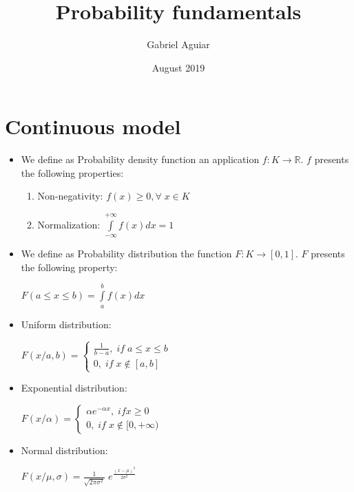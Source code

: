 \documentclass{article}
\title{Probability fundamentals}
\author{Gabriel Aguiar}
\date{August 2019}
\begin{document}
\maketitle

\section{Continuous model}

\begin{itemize}

\item We define as Probability density function an application $f: K \rightarrow \mathbb{R}$. $f$ presents the following properties:

\begin{enumerate}

\item Non-negativity: $f(x) \geq 0, \forall \; x \in K$

\item Normalization: $\int\limits_{-\infty}^{+\infty} f(x) dx = 1$

\end{enumerate}

\item We define as Probability distribution the function $F: K \rightarrow [0,1]$. $F$ presents the following property:

$F(a \leq x \leq b) = \int\limits_{a}^{b} f(x) dx$

\item Uniform distribution:

$F(x/a,b) = \begin{cases} \frac{1}{b - a}, \; if \; a \leq x \leq b \\ 0, \; if \; x \notin [a,b] \end{cases}$

\item Exponential distribution:

$F(x/\alpha) = \begin{cases} \alpha e^{-\alpha x}, \; if x \geq 0 \\ 0, \; if \; x \notin [0,+\infty) \end{cases}$

\item Normal distribution:

$F(x/\mu,\sigma) = \frac{1}{\sqrt{2 \pi \sigma^{2}}} \; e^{\frac{(x - \mu)^{2}}{2 \sigma^{2}}}$
        
\end{itemize}
\end{document}

